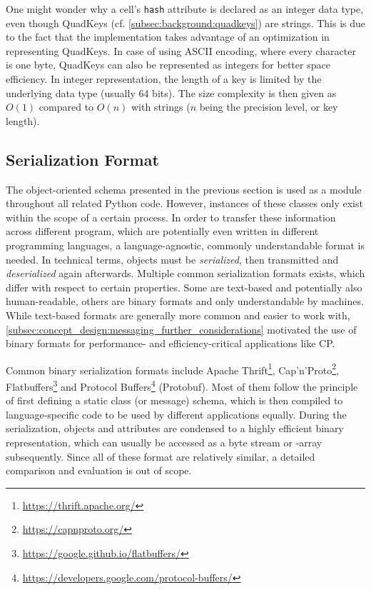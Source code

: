 \par
\medskip
One might wonder why a cell's \texttt{hash} attribute is declared as an integer data type, even though QuadKeys (cf. \cref{subsec:background:quadkeys}) are strings. This is due to the fact that the implementation takes advantage of an optimization in representing QuadKeys. In case of using ASCII encoding, where every character is one byte, QuadKeys can also be represented as integers for better space efficiency. In integer representation, the length of a key is limited by the underlying data type (usually 64 bits). The size complexity is then given as $O(1)$ compared to $O(n)$ with strings ($n$ being the precision level, or key length).

\subsection{Serialization Format}
\label{subsec:implementation:serialization_format}
The object-oriented schema presented in the previous section is used as a module throughout all related Python code. However, instances of these classes only exist within the scope of a certain process. In order to transfer these information across different program, which are potentially even written in different programming languages, a language-agnostic, commonly understandable format is needed. In technical terms, objects must be \textit{serialized}, then transmitted and \textit{deserialized} again afterwards. Multiple common serialization formats exists, which differ with respect to certain properties. Some are text-based and potentially also human-readable, others are binary formats and only understandable by machines. While text-based formats are generally more common and easier to work with, \cref{subsec:concept_design:messaging_further_considerations} motivated the use of binary formats for performance- and efficiency-critical applications like CP.

Common binary serialization formats include Apache Thrift\footnote{\url{https://thrift.apache.org/}}, Cap'n'Proto\footnote{\url{https://capnproto.org/}},  Flatbuffers\footnote{\url{https://google.github.io/flatbuffers/}} and Protocol Buffers\footnote{\url{https://developers.google.com/protocol-buffers/}} (Protobuf). Most of them follow the principle of first defining a static class (or message) schema, which is then compiled to language-specific code to be used by different applications equally. During the serialization, objects and attributes are condensed to a highly efficient binary representation, which can usually be accessed as a byte stream or -array subsequently. Since all of these format are relatively similar, a detailed comparison and evaluation is out of scope.


